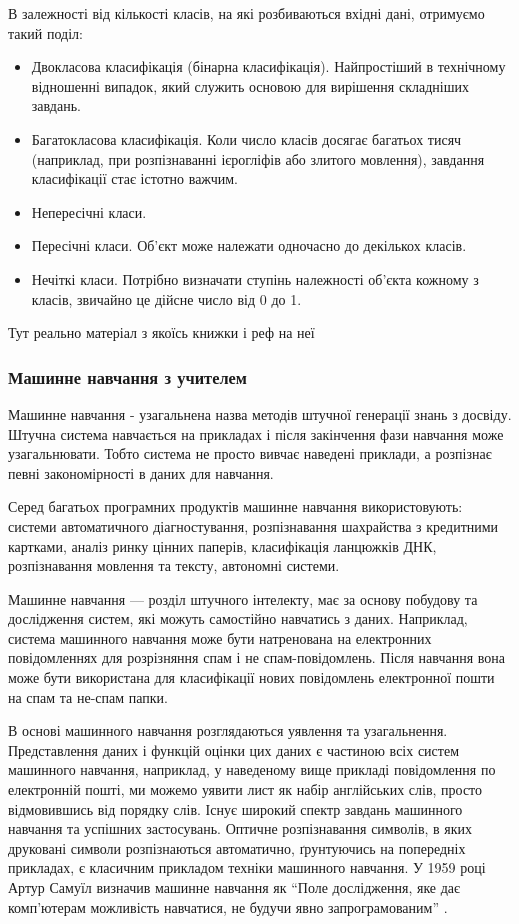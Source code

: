 В залежності від кількості класів, на які розбиваються вхідні дані, отримуємо такий поділ:
\begin{itemize}  
	\item Двокласова класифікація (бінарна класифікація). Найпростіший в технічному відношенні випадок, який служить основою для вирішення складніших завдань.
	\item Багатокласова класифікація. Коли число класів досягає багатьох тисяч (наприклад, при розпізнаванні ієрогліфів або злитого мовлення), завдання класифікації стає істотно важчим.
	\item Непересічні класи.
	\item Пересічні класи. Об'єкт може належати одночасно до декількох класів.
	\item Нечіткі класи. Потрібно визначати ступінь належності об'єкта кожному з класів, звичайно це дійсне число від 0 до 1.
\end{itemize}

Тут реально матеріал з якоїсь книжки і реф на неї \cite{book:1}

\subsubsection{Машинне навчання з учителем}
Машинне навчання - узагальнена назва методів штучної генерації знань з досвіду. Штучна система навчається на прикладах і після закінчення фази навчання може узагальнювати. Тобто система не просто вивчає наведені приклади, а розпізнає певні закономірності в даних для навчання.

Серед багатьох програмних продуктів машинне навчання використовують: системи автоматичного діагностування, розпізнавання шахрайства з кредитними картками, аналіз ринку цінних паперів, класифікація ланцюжків ДНК, розпізнавання мовлення та тексту, автономні системи.

Машинне навчання — розділ штучного інтелекту, має за основу побудову та дослідження систем, які можуть самостійно навчатись з даних. Наприклад, система машинного навчання може бути натренована на електронних повідомленнях для розрізняння спам і не спам-повідомлень. Після навчання вона може бути використана для класифікації нових повідомлень електронної пошти на спам та не-спам папки.

В основі машинного навчання розглядаються уявлення та узагальнення. Представлення даних і функцій оцінки цих даних є частиною всіх систем машинного навчання, наприклад, у наведеному вище прикладі повідомлення по електронній пошті, ми можемо уявити лист як набір англійських слів, просто відмовившись від порядку слів. Існує широкий спектр завдань машинного навчання та успішних застосувань. Оптичне розпізнавання символів, в яких друковані символи розпізнаються автоматично, ґрунтуючись на попередніх прикладах, є класичним прикладом техніки машинного навчання. У 1959 році Артур Самуїл визначив машинне навчання як “Поле дослідження, яке дає комп'ютерам можливість навчатися, не будучи явно запрограмованим” \cite{book:arthur_samuel}.

